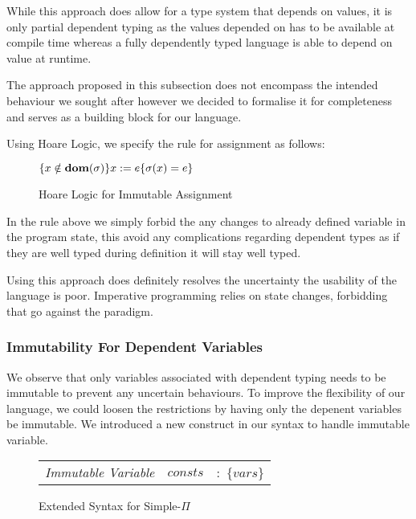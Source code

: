 \documentclass[a4paper,12pt]{report}
\begin{document}
\par
While this approach does allow for a type system that depends on values, it is 
only partial dependent typing as the values depended on has to be available at 
compile time whereas a fully dependently typed language is able to depend on 
value at runtime.

\par
The approach proposed in this subsection does not encompass the intended behaviour we 
sought after however we decided to formalise it for completeness and serves as 
a building block for our language. 

\par
Using Hoare Logic, we specify the rule for assignment as follows:

\begin{figure}[H]
  \begin{center}
    $\{x \notin \text{\textbf{dom}}(\sigma)\}x := e\{\sigma(x) = e\}$
  \end{center}  
  \caption{Hoare Logic for Immutable Assignment}
\end{figure}

In the rule above we simply forbid the any changes to already defined variable 
in the program state, this avoid any complications regarding dependent types as 
if they are well typed during definition it will stay well typed. 

\par
Using this approach does definitely resolves the uncertainty the usability of 
the language is poor. Imperative programming relies on state changes, forbidding 
that go against the paradigm. 

\subsubsection{Immutability For Dependent Variables}
We observe that only variables associated with dependent typing needs to be 
immutable to prevent any uncertain behaviours. To improve the flexibility of our 
language, we could loosen the restrictions by having only the depenent variables 
be immutable. We introduced a new construct in our syntax to handle immutable 
variable. 

\begin{figure}[H]
  \begin{center}
    \begin{tabular} {l l l}
      \textit{Immutable Variable} & $consts$& $:$ $\{vars\}$ \\
    \end{tabular}
  \end{center}
  \caption{Extended Syntax for Simple-$\Pi$}
\end{figure}
\end{document}
